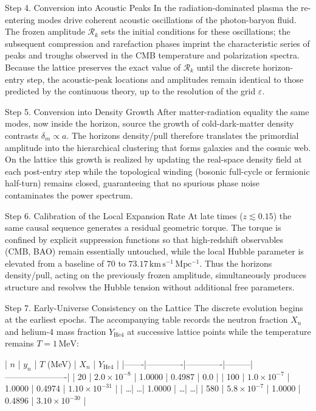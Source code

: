 Step 4. Conversion into Acoustic Peaks  
In the radiation-dominated plasma the re-entering modes drive coherent acoustic oscillations of the photon-baryon fluid. The frozen amplitude \(\mathcal{R}_k\) sets the initial conditions for these oscillations; the subsequent compression and rarefaction phases imprint the characteristic series of peaks and troughs observed in the CMB temperature and polarization spectra. Because the lattice preserves the exact value of \(\mathcal{R}_k\) until the discrete horizon-entry step, the acoustic-peak locations and amplitudes remain identical to those predicted by the continuous theory, up to the resolution of the grid \(\varepsilon\).

Step 5. Conversion into Density Growth  
After matter-radiation equality the same modes, now inside the horizon, source the growth of cold-dark-matter density contrasts \(\delta_m\propto a\). The horizons density/pull therefore translates the primordial amplitude into the hierarchical clustering that forms galaxies and the cosmic web. On the lattice this growth is realized by updating the real-space density field at each post-entry step while the topological winding (bosonic full-cycle or fermionic half-turn) remains closed, guaranteeing that no spurious phase noise contaminates the power spectrum.

Step 6. Calibration of the Local Expansion Rate  
At late times (\(z\lesssim0.15\)) the same causal sequence generates a residual geometric torque. The torque is confined by explicit suppression functions so that high-redshift observables (CMB, BAO) remain essentially untouched, while the local Hubble parameter is elevated from a baseline of \(70\) to \(73.17\,\mathrm{km\,s^{-1}\,Mpc^{-1}}\). Thus the horizons density/pull, acting on the previously frozen amplitude, simultaneously produces structure and resolves the Hubble tension without additional free parameters.

Step 7. Early-Universe Consistency on the Lattice  
The discrete evolution begins at the earliest epochs. The accompanying table records the neutron fraction \(X_n\) and helium-4 mass fraction \(Y_{\mathrm{He4}}\) at successive lattice points while the temperature remains \(T=1\,\mathrm{MeV}\):

| \(n\) | \(y_n\)     | \(T\) (MeV) | \(X_n\)  | \(Y_{\mathrm{He4}}\) |
|-------|-------------|-------------|---------|----------------------|
| 20    | \(2.0\times10^{-8}\) | 1.0000     | 0.4987 | 0.0                  |
| 100   | \(1.0\times10^{-7}\) | 1.0000     | 0.4974 | \(1.10\times10^{-31}\) |
| \ldots | \ldots     | 1.0000     | \ldots | \ldots               |
| 580   | \(5.8\times10^{-7}\) | 1.0000     | 0.4896 | \(3.10\times10^{-30}\) |

